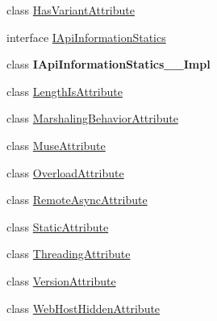 \begin{DoxyCompactItemize}
class \hyperlink{class_windows_1_1_foundation_1_1_metadata_1_1_has_variant_attribute}{Has\+Variant\+Attribute}
\item 
interface \hyperlink{interface_windows_1_1_foundation_1_1_metadata_1_1_i_api_information_statics}{I\+Api\+Information\+Statics}
\item 
class {\bfseries I\+Api\+Information\+Statics\+\_\+\+\_\+\+Impl}
\item 
class \hyperlink{class_windows_1_1_foundation_1_1_metadata_1_1_length_is_attribute}{Length\+Is\+Attribute}
\item 
class \hyperlink{class_windows_1_1_foundation_1_1_metadata_1_1_marshaling_behavior_attribute}{Marshaling\+Behavior\+Attribute}
\item 
class \hyperlink{class_windows_1_1_foundation_1_1_metadata_1_1_muse_attribute}{Muse\+Attribute}
\item 
class \hyperlink{class_windows_1_1_foundation_1_1_metadata_1_1_overload_attribute}{Overload\+Attribute}
\item 
class \hyperlink{class_windows_1_1_foundation_1_1_metadata_1_1_remote_async_attribute}{Remote\+Async\+Attribute}
\item 
class \hyperlink{class_windows_1_1_foundation_1_1_metadata_1_1_static_attribute}{Static\+Attribute}
\item 
class \hyperlink{class_windows_1_1_foundation_1_1_metadata_1_1_threading_attribute}{Threading\+Attribute}
\item 
class \hyperlink{class_windows_1_1_foundation_1_1_metadata_1_1_version_attribute}{Version\+Attribute}
\item 
class \hyperlink{class_windows_1_1_foundation_1_1_metadata_1_1_web_host_hidden_attribute}{Web\+Host\+Hidden\+Attribute}
\end{DoxyCompactItemize}
